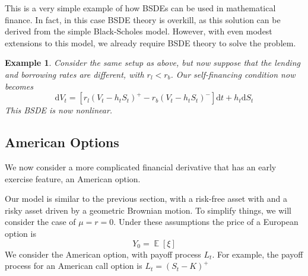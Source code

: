 \documentclass{amsart}
\DeclareMathOperator{\ee}{\mathbb E}
\newtheorem{example}[theorem]{Example}
\theoremstyle{definition}
\theoremstyle{remark}
\numberwithin{equation}{section}
\begin{document}
This is a very simple example of how BSDEs can be used in mathematical finance. In fact, in this case BSDE theory is overkill, as this solution can be derived from the simple Black-Scholes model. 
However, with even modest extensions to this model, we already require BSDE theory to solve the problem. 

\begin{example}
    Consider the same setup as above, but now suppose that the lending and borrowing rates are different, with $r_l < r_b$. 
    Our self-financing condition now becomes
    \begin{equation}
        \mathrm{d} V_t = [
            r_l (V_t - h_t S_t)^+ - r_b (V_t - h_t S_t)^- 
        ] \mathrm{d} t + h_t \mathrm{d} S_t
    \end{equation}
    This BSDE is now nonlinear.
\end{example}

\subsection{American Options}
We now consider a more complicated financial derivative that has an early exercise feature, an American option.

Our model is similar to the previous section, with a risk-free asset with and a risky asset driven by a geometric Brownian motion.
To simplify things, we will consider the case of $\mu = r = 0$. Under these assumptions the price of a European option is 
\[
Y_0 = \ee [\xi]
\]
We consider the American option, with payoff process $L_t$. For example, the payoff process for an American call option is $L_t = (S_t - K)^+$
\end{document}
